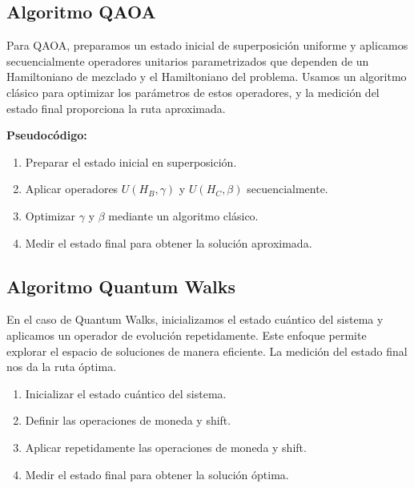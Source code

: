 \documentclass[11pt,a4paper,spanish]{book}
\begin{document}
\subsection{Algoritmo QAOA}

Para QAOA, preparamos un estado inicial de superposición uniforme y aplicamos secuencialmente operadores unitarios parametrizados que dependen de un Hamiltoniano de mezclado y el Hamiltoniano del problema. Usamos un algoritmo clásico para optimizar los parámetros de estos operadores, y la medición del estado final proporciona la ruta aproximada.


\textbf{Pseudocódigo:}
\begin{tcolorbox}[colback=white!95!blue, colframe=blue!50!black, title=Quantum Approximate Optimization Algorithm (QAOA), fontupper=\ttfamily]
\begin{spacing}{0.9}
\begin{enumerate}
    \item Preparar el estado inicial en superposición.
    \item Aplicar operadores \(U(H_B, \gamma)\) y \(U(H_C, \beta)\) secuencialmente.
    \item Optimizar \(\gamma\) y \(\beta\) mediante un algoritmo clásico.
    \item Medir el estado final para obtener la solución aproximada.
\end{enumerate}
\end{spacing}
\end{tcolorbox}


\subsection{Algoritmo Quantum Walks}
En el caso de Quantum Walks, inicializamos el estado cuántico del sistema y aplicamos un operador de evolución repetidamente. Este enfoque permite explorar el espacio de soluciones de manera eficiente. La medición del estado final nos da la ruta óptima.

\begin{tcolorbox}[colback=white!95!blue, colframe=blue!50!black, title=Quantum Walks (QW), fontupper=\ttfamily]
\begin{spacing}{0.9}
\begin{enumerate}
    \item Inicializar el estado cuántico del sistema.
    \item Definir las operaciones de moneda y shift.
    \item Aplicar repetidamente las operaciones de moneda y shift.
    \item Medir el estado final para obtener la solución óptima.
\end{enumerate}
\end{spacing}
\end{tcolorbox}
\end{document}
